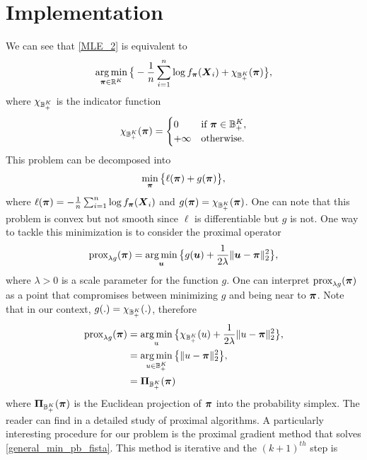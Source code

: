 \section{Implementation}
We can see that \cref{MLE_2} is equivalent to
\begin{equation}
\operatorname*{arg\,min}_{\boldsymbol \pi\in{\mathbb R}^K}\big\{-\frac{1}{n}\sum_{i=1}^n\log f_{\boldsymbol \pi}(\boldsymbol X_i)+\chi_{{\mathbb B}_+^K}(\boldsymbol \pi)\big\},
\end{equation}
where $\chi_{{\mathbb B}_+^K}$ is the indicator function
\begin{equation*}
    \chi_{{\mathbb B}_+^K}(\boldsymbol \pi) =
    \begin{cases}
      0 & \text{if } \boldsymbol \pi\in {\mathbb B}_+^K,\\
      +\infty & \text{otherwise} .
    \end{cases}
\end{equation*}
This problem can be decomposed into 
\begin{equation}
\label{general_min_pb_fista}
    \min_{\boldsymbol \pi}\big\{\ell(\boldsymbol \pi)+g(\boldsymbol \pi)\big\},
\end{equation}
where $\ell(\boldsymbol \pi) =-\frac{1}{n}\sum_{i=1}^n\log f_{\boldsymbol \pi}(\boldsymbol X_i)$ and $g(\boldsymbol \pi)=\chi_{{\mathbb B}_+^K}(\boldsymbol \pi)$. One can note that this problem is convex but not smooth since $\ell$ is differentiable but $g$ is not. One way to tackle this minimization is to consider the proximal operator
\begin{equation}
    \textnormal{prox}_{\lambda g}(\boldsymbol \pi) = \operatorname*{arg\,min}_{\boldsymbol u}\big\{g(\boldsymbol u)+\frac{1}{2\lambda}\|\boldsymbol u-\boldsymbol \pi\|^2_2\big\},
\end{equation}
where $\lambda > 0$ is a scale parameter for the function $g$. One can interpret $\textnormal{prox}_{\lambda g}(\boldsymbol \pi)$ as a point that compromises between minimizing $g$ and being near to $\boldsymbol \pi$. Note that in our context, $g(.)=\chi_{{\mathbb B}_+^K}(.)$, therefore
\begin{align*}
    \textnormal{prox}_{\lambda g}(\boldsymbol \pi) &= \operatorname*{arg\,min}_{u}\big\{\chi_{{\mathbb B}_+^K}(u)+\frac{1}{2\lambda}\|u-\boldsymbol \pi\|^2_2\big\},\\
    &= \operatorname*{arg\,min}_{u\in {\mathbb B}_+^K}\big\{\|u-\boldsymbol \pi\|^2_2\big\},\\
    &= \boldsymbol\Pi_{{\mathbb B}_+^K}(\boldsymbol \pi)
\end{align*}
where $\boldsymbol\Pi_{{\mathbb B}_+^K}(\boldsymbol \pi)$ is the Euclidean projection of $\boldsymbol \pi$ into the probability simplex. The reader can find in \citep{Parikh:2014:PA:2693612.2693613} a detailed study of proximal algorithms. A particularly interesting procedure for our problem is the proximal gradient method that solves \cref{general_min_pb_fista}. This method is iterative and the $(k+1)^{th}$ step is

